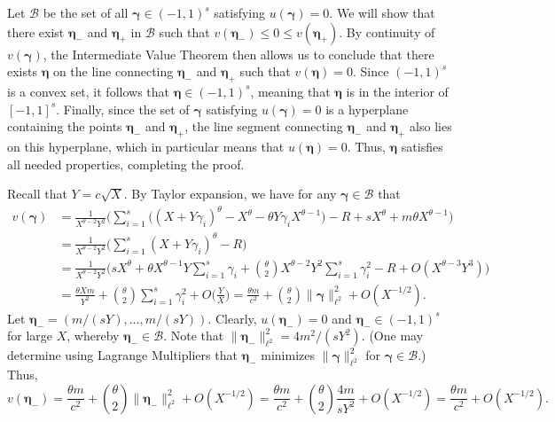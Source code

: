 \documentclass[11pt,reqno]{amsart}
\numberwithin{equation}{section}
\begin{document}
Let $\mathcal{B}$ be the set of all $\boldsymbol{\gamma} \in (-1,1)^s $ satisfying $u(\boldsymbol{\gamma}) = 0$. We will show that there exist $\boldsymbol{\eta_-}$ and $\boldsymbol{\eta_+} $ in $\mathcal{B}$ such that $v(\boldsymbol{\eta_-}) \leq 0 \leq v(\boldsymbol{\eta_+})$. By continuity of $v(\boldsymbol{\gamma})$, the Intermediate Value Theorem then allows us to conclude that there exists $\boldsymbol{\eta}$ on the line connecting $\boldsymbol{\eta_-}$ and $\boldsymbol{\eta_+}$ such that $v(\boldsymbol{\eta}) = 0$. Since $(-1,1)^s$ is a convex set, it follows that $\boldsymbol{\eta} \in (-1,1)^s $, meaning that $\boldsymbol{\eta}$ is in the interior of $[-1,1]^s$. Finally, since the set of $\boldsymbol{\gamma}$ satisfying $u(\boldsymbol{\gamma}) = 0$ is a hyperplane containing the points $\boldsymbol{\eta_-}$ and $\boldsymbol{\eta_+}$, the line segment connecting $\boldsymbol{\eta_-}$ and $\boldsymbol{\eta_+}$ also lies on this hyperplane, which in particular means that $u(\boldsymbol{\eta}) = 0$. Thus, $\boldsymbol{\eta}$ satisfies all needed properties, completing the proof.

Recall that $Y = c\sqrt{X}$. By Taylor expansion, we have for any $\boldsymbol{\gamma} \in \mathcal{B}$ that 
\begin{align*} \label{eq:expandv}
v(\boldsymbol{\gamma}) & = \frac{1}{X^{\theta-2}Y^2} \Big(\sum_{i=1}^s \big((X+Y\gamma_i)^{\theta}-X^{\theta}-\theta Y \gamma_i X^{\theta-1}\big)-R+sX^{\theta}+m\theta X^{\theta-1}\Big) 
\\ & = \frac{1}{X^{\theta-2}Y^2} \Big( \sum_{i=1}^s (X+Y\gamma_i)^{\theta}-R\Big) 
\\ & = \frac{1}{X^{\theta-2}Y^2} \Big( sX^{\theta}+\theta X^{\theta-1}Y\sum_{i=1}^s \gamma_i + \binom{\theta}{2}X^{\theta-2}Y^2\sum_{i=1}^s \gamma_i^2 -R+O(X^{\theta-3}Y^3)\Big)
\\ & = \frac{\theta Xm}{Y^2} +\binom{\theta}{2}\sum_{i=1}^s \gamma_i^2 + O\Big(\frac{Y}{X}\Big) = \frac{\theta m }{c^2}+\binom{\theta}{2}\| \boldsymbol{\gamma}\|_{\ell^2}^2+O(X^{-1/2}). 
\end{align*}
Let $\boldsymbol{\eta_-} = (m/(sY),\ldots,m/(sY))$. Clearly, $u(\boldsymbol{\eta_-}) = 0$ and $\boldsymbol{\eta_-} \in (-1,1)^s$ for large $X$, whereby $\boldsymbol{\eta_-} \in \mathcal{B}$. Note that $\| \boldsymbol{\eta_-}\|_{\ell^2}^2 = 4m^2/(sY^2)$. (One may determine using Lagrange Multipliers that $\boldsymbol{\eta_-}$ minimizes $\| \boldsymbol{\gamma} \|_{\ell^2}^2$ for $\boldsymbol{\gamma} \in \mathcal{B}$.) Thus, 
\[ v(\boldsymbol{\eta_-}) = \frac{\theta m }{c^2}+\binom{\theta}{2}\| \boldsymbol{\eta_-}\|_{\ell^2}^2+O(X^{-1/2}) = \frac{\theta m}{c^2}+\binom{\theta }{2}\frac{4m}{sY^2}+O(X^{-1/2}) = \frac{\theta m}{c^2}+O(X^{-1/2}).  \]
\end{document}
